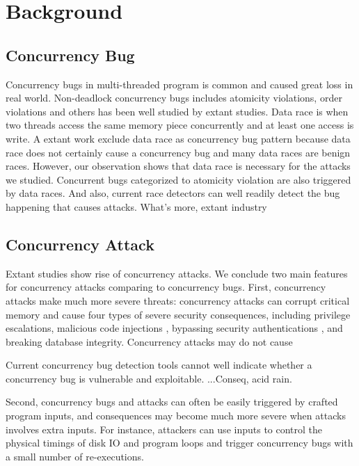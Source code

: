 \section{Background}\label{sec:background}

\subsection{Concurrency Bug}

Concurrency bugs in multi-threaded program is common and caused great loss in real world. 
Non-deadlock concurrency bugs includes 
atomicity violations\cite{}, order violations\cite{} and others  has been well studied 
by extant studies\cite{lu:concurrency-bugs,conmem:asplos10}. Data race is when two threads 
access the same memory piece concurrently and at least one access is write.
A extant work exclude data race as concurrency bug pattern 
because data race does not certainly cause a concurrency bug\cite{lu:concurrency-bugs} and many data races are benign races. 
However, our observation shows that data race is necessary for the attacks we studied.  
Concurrent bugs categorized to atomicity violation are also triggered by data races.
And also, current race detectors can well readily detect the bug happening that causes attacks.
What's more, extant industry 

 
\subsection{Concurrency Attack}
Extant studies \cite{con:hotpar12, acidrain:sigmod17} show rise of concurrency 
attacks. We conclude two main features for concurrency attacks comparing to concurrency bugs. 
First, concurrency attacks make much more severe threats:
concurrency attacks can corrupt critical memory and cause four
types of severe security consequences, including privilege escalations\cite{uselib-bug-12791, mysql-bug-24988},
malicious code injections \cite{msiexploit},  
bypassing security authentications\cite{cve-2010-0923, cve-2008-0034, cve-2010-1754}
, and breaking database integrity\cite{acidrain:sigmod17}. 
Concurrency attacks may do not cause 

Current concurrency bug detection tools cannot well indicate whether a concurrency bug is vulnerable and exploitable.
...Conseq, acid rain.

Second, concurrency bugs and attacks can often be easily
triggered by crafted program inputs, and consequences may 
become much more severe when attacks involves extra inputs.  
For instance, attackers
can use inputs to control the physical timings of disk
IO and program loops and trigger concurrency bugs with a
small number of re-executions. 


